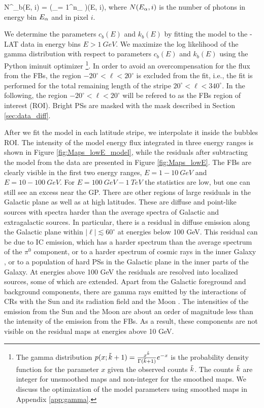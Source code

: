 \be
\tilde N^\low_b(E, i) =  \left(\sum_{\alpha = 1}^{n_\low}  \right)\tau(E, i),
\ee
where $N(E_\alpha, i)$ is the number of photons in energy bin $E_\alpha$ and in pixel $i$.

We determine the parameters $c_{b}(E)$ and $k_{b}(E)$ by fitting the model to the \Fermi-LAT data in energy bins 
$E > \SI{1}{GeV}$.
We maximize the log likelihood of the gamma distribution 
with respect to parameters $c_{b}(E)$ and $k_{b}(E)$
using the Python iminuit optimizer%
\footnote{
The gamma distribution $p(x; \tilde{k} + 1) = \frac{x^{\tilde{k}}}{\Gamma (\tilde{k} + 1)}e^{-x}$ is the probability density function
for the parameter $x$ given the observed counts $\tilde{k}$.
The counts $\tilde{k}$ are integer for unsmoothed maps and non-integer for the smoothed maps.
We discuss the optimization of the model parameters using smoothed maps in 
Appendix \ref{app:gamma}.
}.
In order to avoid an overcompensation 
for the flux from the FBs, the region $-20^\circ < \ell < 20^\circ$
is excluded from the fit, i.e., the fit is performed for 
the total remaining length of the stripe $20^\circ < \ell < 340^\circ$.
In the following, the region $-20^\circ < \ell < 20^\circ$ will be refered to as the FBs region of interest (ROI).
Bright PSs are masked with the mask described in Section \ref{sec:data_diff}.


After we fit the model in each latitude stripe, we interpolate it inside the bubbles ROI.
The intensity of the model energy flux integrated in three energy ranges
is shown in Figure \ref{fig:Maps_lowE_model},
while the residuals after subtracting the model from the data are presented in Figure \ref{fig:Maps_lowE}.
The FBs are clearly visible in the first two energy ranges, $E = 1 - \SI{10}{GeV}$ and $E = 10 - \SI{100}{GeV}$.
For $E = \SI{100}{GeV} - \SI{1}{TeV}$ the statistics are low, but one can still see an excess near the GP.
There are other regions of large residuals in the Galactic plane as well as at high latitudes.
These are diffuse and point-like sources with spectra harder than the average spectra of Galactic and
extragalactic sources.
In particular, there is a residual in diffuse emission along the Galactic plane within $|\ell | \lesssim 60^\circ$ at energies below 100 GeV.
This residual can be due to IC emission, which has a harder spectrum than the average spectrum of the $\pi^0$ component,
or to a harder spectrum of cosmic rays in the inner Galaxy \citep{2015PhRvD..91h3012G, 2016ApJS..223...26A},
or to a population of hard PSs in the Galactic plane in the inner parts of the Galaxy.
At energies above 100 GeV the residuals are resolved into localized sources, some of which are extended.
Apart from the Galactic foreground and background components, there are gamma rays emitted by the interactions of CRs with 
the Sun and its radiation field \citep{2011ApJ...734..116A} and the Moon \citep{2016PhRvD..93h2001A}.
The intensities of the emission from the Sun and the Moon are about an order of magnitude less than 
the intensity of the emission from the FBs. 
As a result, these components are not visible on  the residual maps at energies above 10 GeV.

